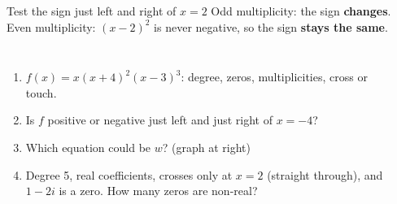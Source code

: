 \documentclass[aspectratio=169, 11pt]{beamer}
\begin{document}
\begin{frame}[t, plain]
  \begin{block}{Test the sign just left and right of \(x = 2\)}
    Odd multiplicity: the sign \textbf{changes}. Even multiplicity: \((x - 2)^2\) is never
    negative, so the sign \textbf{stays the same}.
  \end{block}
\end{frame}

\begin{frame}[t, plain]

  \begin{columns}[T]
      \begin{enumerate}\setlength{\itemsep}{6pt}
        \setcounter{enumi}{14}
        \item \(f(x) = x(x + 4)^2(x - 3)^3\): degree, zeros, multiplicities, cross or touch.
        \item Is \(f\) positive or negative just left and just right of \(x = -4\)?
        \item Which equation could be \(w\)? (graph at right)
        \item Degree 5, real coefficients, crosses only at \(x = 2\) (straight through), and
              \(1 - 2i\) is a zero. How many zeros are non-real?
      \end{enumerate}

      \begin{center}
      \end{center}
  \end{columns}
\end{frame}
\end{document}
